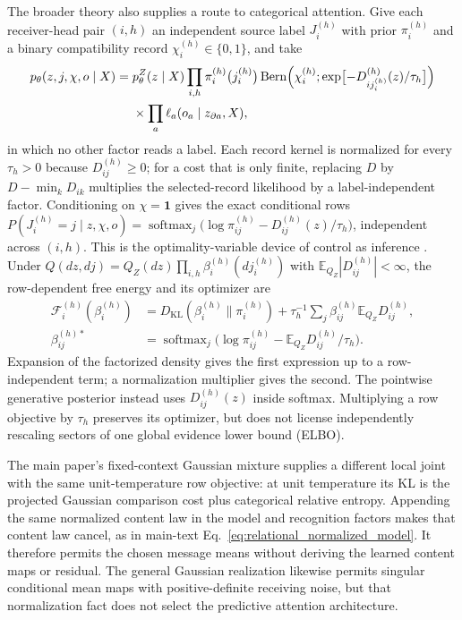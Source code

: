 \documentclass[twoside,11pt]{article}
\begin{document}
The broader theory also supplies a route to categorical attention. Give each receiver-head pair $(i,h)$ an independent source label $J_i^{(h)}$ with prior $\pi_i^{(h)}$ and a binary compatibility record $\chi_i^{(h)}\in\{0,1\}$, and take
\begin{equation}
\begin{aligned}
p_\theta(z,j,\chi,o\mid X)={}&p_\theta^Z(z\mid X)\prod_{i,h}\pi_i^{(h)}\bigl(j_i^{(h)}\bigr)\operatorname{Bern}\Bigl(\chi_i^{(h)};\exp\bigl[-D_{ij_i^{(h)}}^{(h)}(z)/\tau_h\bigr]\Bigr)\\
&\times\prod_a\ell_a(o_a\mid z_{\partial a},X),
\end{aligned}
\label{eq:rg_bridge_record_joint}
\end{equation}
in which no other factor reads a label. Each record kernel is normalized for every $\tau_h>0$ because $D_{ij}^{(h)}\ge0$; for a cost that is only finite, replacing $D$ by $D-\min_kD_{ik}$ multiplies the selected-record likelihood by a label-independent factor. Conditioning on $\chi=\mathbf 1$ gives the exact conditional rows $P(J_i^{(h)}=j\mid z,\chi,o)=\operatorname{softmax}_j\bigl(\log\pi_{ij}^{(h)}-D_{ij}^{(h)}(z)/\tau_h\bigr)$, independent across $(i,h)$. This is the optimality-variable device of control as inference \citep{Levine2018}. Under $Q(dz,dj)=Q_Z(dz)\prod_{i,h}\beta_i^{(h)}(dj_i^{(h)})$ with $\mathbb E_{Q_Z}|D_{ij}^{(h)}|<\infty$, the row-dependent free energy and its optimizer are
\begin{align}
\mathcal F_i^{(h)}(\beta_i^{(h)})&=D_{\mathrm{KL}}(\beta_i^{(h)}\|\pi_i^{(h)})+\tau_h^{-1}\sum_j\beta_{ij}^{(h)}\mathbb E_{Q_Z}D_{ij}^{(h)},\\
\beta_{ij}^{(h)*}&=\operatorname{softmax}_j\bigl(\log\pi_{ij}^{(h)}-\mathbb E_{Q_Z}D_{ij}^{(h)}/\tau_h\bigr).
\label{eq:rg_bridge_row}
\end{align}
Expansion of the factorized density gives the first expression up to a row-independent term; a normalization multiplier gives the second. The pointwise generative posterior instead uses $D_{ij}^{(h)}(z)$ inside softmax. Multiplying a row objective by $\tau_h$ preserves its optimizer, but does not license independently rescaling sectors of one global evidence lower bound (ELBO).

The main paper's fixed-context Gaussian mixture supplies a different local joint with the same unit-temperature row objective: at unit temperature its KL is the projected Gaussian comparison cost plus categorical relative entropy. Appending the same normalized content law in the model and recognition factors makes that content law cancel, as in main-text Eq.~\eqref{eq:relational_normalized_model}. It therefore permits the chosen message means without deriving the learned content maps or residual. The general Gaussian realization likewise permits singular conditional mean maps with positive-definite receiving noise, but that normalization fact does not select the predictive attention architecture.
\end{document}
